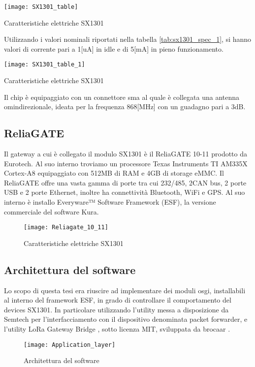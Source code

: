 \begin{table}[h]
\centering 
\texttt{[image: SX1301\_table]}
\caption{Caratteristiche elettriche SX1301}
\label{tab:sx1301_spec}
\end{table}
Utilizzando i valori nominali riportati nella tabella \ref{tab:sx1301_spec_1},
si hanno valori di corrente pari a 1[uA] in idle  e di 5[mA] in pieno
funzionamento.
\begin{table}[h]
\centering 
\texttt{[image: SX1301\_table\_1]}
\caption{Caratteristiche elettriche SX1301}
\label{tab:sx1301_spec_1}
\end{table}
Il chip è equipaggiato con un connettore sma al quale è collegata una
antenna omindirezionale, ideata per la frequenza 868[MHz] con un guadagno pari a 3dB.
\subsection{ReliaGATE}
Il gateway a cui è collegato il modulo SX1301 è il ReliaGATE 10-11 prodotto da
Eurotech. Al suo interno troviamo un processore Texas Instruments TI AM335X Cortex-A8 
equipaggiato con 512MB di RAM e 4GB di storage eMMC. Il ReliaGATE offre una
vasta gamma di porte tra cui 232/485, 2CAN bus, 2 porte USB e 2 porte Ethernet,
inoltre ha connettività Bluetooth, WiFi e GPS. Al suo interno è installo
Everyware™ Software Framework (ESF), la versione commerciale del software Kura.
\begin{figure}[h]
\centering 
\texttt{[image: Reliagate\_10\_11]}
\caption{Caratteristiche elettriche SX1301}
\label{fig:ReliaGATE}
\end{figure}


\subsection{Architettura del software}
Lo scopo di questa tesi era riuscire ad implementare dei moduli osgi,
installabili al interno del framework ESF, in grado di controllare il
comportamento del devices SX1301. In particolare utilizzando l'utility messa a
disposizione da Semtech per l'interfacciamento con il dispositivo denominata
packet forwarder, e l'utility LoRa Gateway Bridge , sotto licenza MIT,
sviluppata da brocaar .

\begin{figure}[h]
\centering 
\texttt{[image: Application\_layer]}
\caption{Architettura del software}
\label{fig:Software_stack}
\end{figure}


